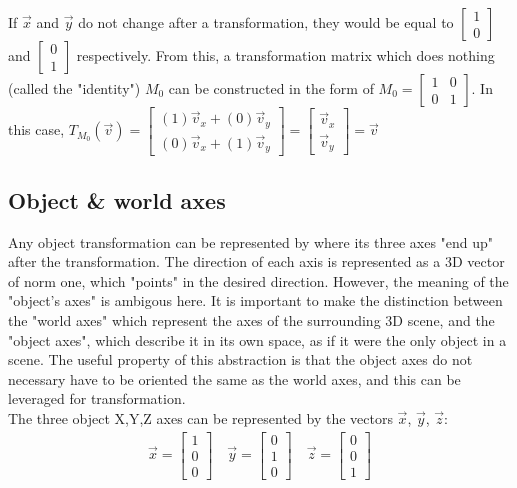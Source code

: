 \documentclass[12pt, a4paper]{article}
\begin{document}
If $\vec{x}$ and $\vec{y}$ do not change after a transformation, they would be
equal to $\begin{bmatrix} 1 \\ 0 \end{bmatrix}$ and $\begin{bmatrix} 0 \\ 1
\end{bmatrix}$ respectively. From this, a transformation matrix which does nothing
(called the "identity") $M_0$ can be constructed in the form of
$
M_0 = \begin{bmatrix} 
    1 & 0 \\
    0 & 1
\end{bmatrix}
$. In this case, $T_{M_0}(\vec{v}) = \begin{bmatrix}
    (1)\vec{v}_x + (0)\vec{v}_y \\
    (0)\vec{v}_x + (1)\vec{v}_y
\end{bmatrix} = \begin{bmatrix}
    \vec{v}_x\\
    \vec{v}_y
\end{bmatrix} = \vec{v}$\\

\subsection{Object \& world axes}
Any object transformation can be represented by where its three axes "end up"
after the transformation. The direction of each axis is represented as a 3D
vector of norm one, which "points" in the desired direction. However, the
meaning of the "object's axes" is ambigous here. It is important to make the
distinction between the "world axes" which represent the axes of the surrounding
3D scene, and the "object axes", which describe it in its own space, as if it
were the only object in a scene. The useful property of this abstraction is that
the object axes do not necessary have to be oriented the same as the world axes,
and this can be leveraged for transformation. \\

The three object X,Y,Z axes can be represented by the vectors
$\vec{x}$, $\vec{y}$, $\vec{z}$: \\

\begin{align*}
    \vec{x} = \begin{bmatrix} 1 \\ 0 \\ 0 \end{bmatrix}
    \quad
    \vec{y} = \begin{bmatrix} 0 \\ 1 \\ 0 \end{bmatrix}
    \quad
    \vec{z} = \begin{bmatrix} 0 \\ 0 \\ 1 \end{bmatrix}
\end{align*} \\
\end{document}
